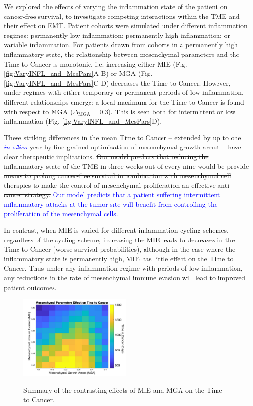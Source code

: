 \documentclass[11pt]{article}
\newcommand{\tcb} { \textcolor{blue} }
\begin{document}
We explored the effects of varying the inflammation state of the patient on cancer-free survival, to investigate competing interactions within the TME and their effect on EMT. Patient cohorts were simulated under different inflammation regimes: permanently low inflammation; permanently high inflammation; or variable inflammation. For patients drawn from cohorts in a permanently high inflammatory state, the relationship between mesenchymal parameters and the Time to Cancer is monotonic, i.e. increasing either MIE (Fig. \ref{fig:VaryINFL_and_MesPars}A-B) or MGA (Fig. \ref{fig:VaryINFL_and_MesPars}C-D) decreases the Time to Cancer.
However, under regimes with either temporary or permanent periods of low inflammation, different relationships emerge: a local maximum for the Time to Cancer is found with respect to MGA ($\Delta_\text{MGA}= 0.3$). This is seen both for intermittent or low inflammation (Fig. \ref{fig:VaryINFL_and_MesPars}D). 
\par
These striking differences in the mean Time to Cancer -- extended by up to one \tcb{{\it in silico}} year by fine-grained optimization of mesenchymal growth arrest -- have clear therapeutic implications. 
\sout{
Our model predicts that reducing the inflammatory state of the TME in three weeks out of every nine would be provide means to prolong cancer-free survival in combination with mesenchymal cell therapies to make the control of mesenchymal proliferation an effective anti-cancer strategy.
}
\tcb{
Our model predicts that a patient suffering intermittent inflammatory attacks at the tumor site will benefit from controlling the proliferation of the mesenchymal cells.
}
\par
In contrast, when MIE is varied for different inflammation cycling schemes, regardless of the cycling scheme, increasing the MIE leads to decreases in the Time to Cancer (worse survival probabilities), although in the case where the inflammatory state is permanently high, MIE has little effect on the Time to Cancer. Thus under any inflammation regime with periods of low inflammation, any reductions in the rate of mesenchymal immune evasion will lead to improved patient outcomes.

\begin{figure}
\center
{\includegraphics[width=0.5\textwidth]{Figure5/MIEvsMGA_bigcbar.jpg}}
\caption{Summary of the contrasting effects of MIE and MGA on the Time to Cancer.
}
\label{fig:MIEvsMGA}
\end{figure}
\end{document}
